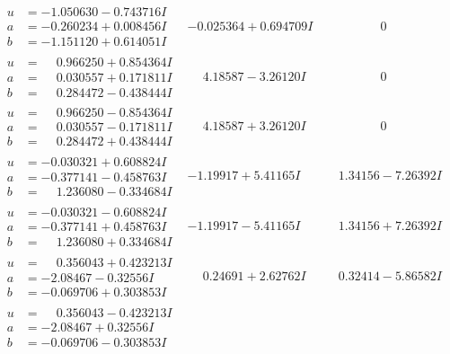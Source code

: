 \documentclass[1p]{elsarticle_modified}
\theoremstyle{definition}
\begin{document}
$$\begin{array}{c|c|c}
\begin{aligned}
u &= -1.050630 - 0.743716 I \\
a &= -0.260234 + 0.008456 I \\
b &= -1.151120 + 0.614051 I\end{aligned}
 & -0.025364 + 0.694709 I & \phantom{-0.000000 } 0 \\ \hline\begin{aligned}
u &= \phantom{-}0.966250 + 0.854364 I \\
a &= \phantom{-}0.030557 + 0.171811 I \\
b &= \phantom{-}0.284472 - 0.438444 I\end{aligned}
 & \phantom{-}4.18587 - 3.26120 I & \phantom{-0.000000 } 0 \\ \hline\begin{aligned}
u &= \phantom{-}0.966250 - 0.854364 I \\
a &= \phantom{-}0.030557 - 0.171811 I \\
b &= \phantom{-}0.284472 + 0.438444 I\end{aligned}
 & \phantom{-}4.18587 + 3.26120 I & \phantom{-0.000000 } 0 \\ \hline\begin{aligned}
u &= -0.030321 + 0.608824 I \\
a &= -0.377141 - 0.458763 I \\
b &= \phantom{-}1.236080 - 0.334684 I\end{aligned}
 & -1.19917 + 5.41165 I & \phantom{-}1.34156 - 7.26392 I \\ \hline\begin{aligned}
u &= -0.030321 - 0.608824 I \\
a &= -0.377141 + 0.458763 I \\
b &= \phantom{-}1.236080 + 0.334684 I\end{aligned}
 & -1.19917 - 5.41165 I & \phantom{-}1.34156 + 7.26392 I \\ \hline\begin{aligned}
u &= \phantom{-}0.356043 + 0.423213 I \\
a &= -2.08467 - 0.32556 I \\
b &= -0.069706 + 0.303853 I\end{aligned}
 & \phantom{-}0.24691 + 2.62762 I & \phantom{-}0.32414 - 5.86582 I \\ \hline\begin{aligned}
u &= \phantom{-}0.356043 - 0.423213 I \\
a &= -2.08467 + 0.32556 I \\
b &= -0.069706 - 0.303853 I\end{aligned}

\end{array}$$
\end{document}
